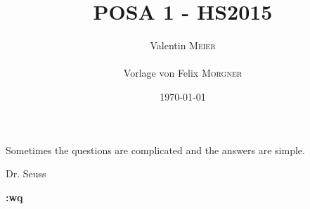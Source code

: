 \documentclass{report}
\title{POSA 1 - HS2015}
\author{Valentin \textsc{Meier}\\\\Vorlage von Felix \textsc{Morgner}}
\date{\today}
\begin{document}
\maketitle
\clearpage
\vspace*{\fill}
  \epigraph{Sometimes the questions are complicated and the answers are simple.}{Dr. Seuss}
\vfill
\clearpage

\setcounter{tocdepth}{0}
\tableofcontents






\clearpage
\vspace*{\fill}
\begin{center}
    { \huge \bfseries :wq }
\end{center}
\vfill
\clearpage
\end{document}
